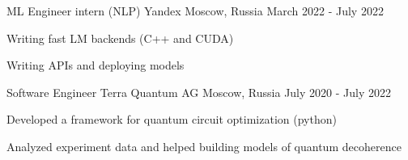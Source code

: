 
\begin{cventries}
  \cventry
    {ML Engineer intern (NLP)}
    {Yandex}
    {Moscow, Russia}
    {March 2022 - July 2022}
    {
      \begin{cvitems} %
        \item {Writing fast LM backends (C++ and CUDA)}
        \item {Writing APIs and deploying models}
      \end{cvitems}
    }
    
  \cventry
    {Software Engineer} %
    {Terra Quantum AG} %
    {Moscow, Russia} %
    {July 2020 - July 2022} %
    {
      \begin{cvitems} %
        \item {Developed a framework for quantum circuit optimization (python)}
        \item {Analyzed experiment data and helped building models of quantum decoherence}
      \end{cvitems}
    }
    
\end{cventries}
